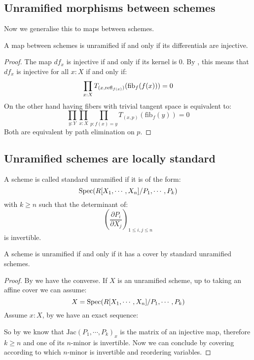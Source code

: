 \subsection{Unramified morphisms between schemes}

Now we generalise this to maps between schemes.

\begin{proposition}\label{unramified-map-characterisation}
A map between schemes is unramified if and only if its differentials are injective. 
\end{proposition}

\begin{proof}
The map $df_x$ is injective if and only if its kernel is $0$. By , this means that $df_x$ is injective for all $x:X$ if and only if:
\[
\prod_{x:X}T_{(x,\mathrm{refl}_{f(x)})}(\mathrm{fib}_f(f(x)))=0
\]
On the other hand having fibers with trivial tangent space is equivalent to:
\[
\prod_{y:Y}\prod_{x:X}\prod_{p:f(x)=y} T_{(x,p)}(\mathrm{fib}_f(y)) = 0
\]
Both are equivalent by path elimination on $p$.
\end{proof}


\subsection{Unramified schemes are locally standard}

\begin{definition}
A scheme is called standard unramified if it is of the form:
\[\operatorname{Spec}(R[X_1,\cdots,X_n]/P_1,\cdots,P_k)\]
with $k\geq n$ such that the determinant of:
\[\left( \frac{\partial P_i}{\partial X_j}\right)_{1\leq i,j\leq n}\]
is invertible.
\end{definition}

\begin{proposition}
A scheme is unramified if and only if it has a cover by standard unramified schemes.
\end{proposition}

\begin{proof}
By  we have the converse. If $X$ is an unramified scheme, up to taking an affine cover we can assume:
\[X = \operatorname{Spec}(R[X_1,\cdots,X_n]/P_1,\cdots,P_k)\]
Assume $x:X$, by  we have an exact sequence: 
\begin{center}
\end{center}
So by  we know that $\mathrm{Jac}(P_1,\cdots,P_k)_{x}$ is the matrix of an injective map, therefore $k\geq n$ and one of its $n$-minor is invertible. Now we can conclude by covering according to which $n$-minor is invertible and reordering variables.
\end{proof}


